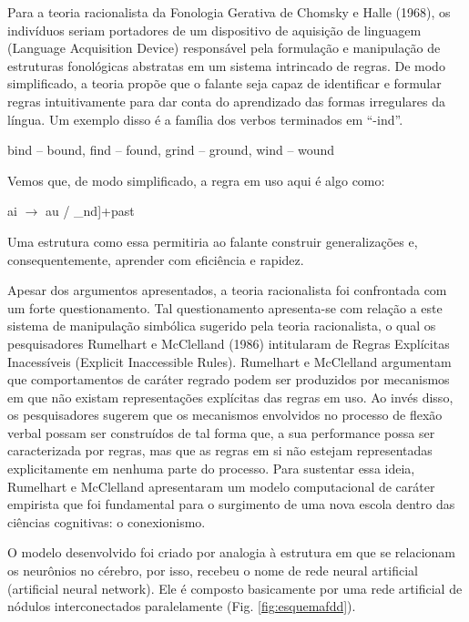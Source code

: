 Para a teoria racionalista da Fonologia Gerativa de Chomsky e Halle (1968), os indivíduos seriam portadores de um dispositivo de aquisição de linguagem (Language Acquisition Device) responsável pela formulação e manipulação de estruturas fonológicas abstratas em um sistema intrincado de regras. De modo simplificado, a teoria propõe que o falante seja capaz de identificar e formular regras intuitivamente para dar conta do aprendizado das formas irregulares da língua. Um exemplo disso é a família dos verbos terminados em “-ind”.

\begin{center}
bind – bound, find – found, grind – ground, wind – wound
\end{center}

Vemos que, de modo simplificado, a regra em uso aqui é algo como:
\begin{center}
ai $\rightarrow$ au / \_nd]+past
\end{center}

Uma estrutura como essa permitiria ao falante construir generalizações e, consequentemente, aprender com eficiência e rapidez. 

Apesar dos argumentos apresentados, a teoria racionalista foi confrontada com um forte questionamento. Tal questionamento apresenta-se com relação a este sistema de manipulação simbólica sugerido pela teoria racionalista, o qual os pesquisadores Rumelhart e McClelland (1986) intitularam de Regras Explícitas Inacessíveis (Explicit Inaccessible Rules). Rumelhart e McClelland argumentam que comportamentos de caráter regrado podem ser produzidos por mecanismos em que não existam representações explícitas das regras em uso. Ao invés disso, os pesquisadores sugerem que os mecanismos envolvidos no processo de flexão verbal possam ser construídos de tal forma que, a sua performance possa ser caracterizada por regras, mas que as regras em si não estejam representadas explicitamente em nenhuma parte do processo. Para sustentar essa ideia, Rumelhart e McClelland apresentaram um modelo computacional  de caráter empirista que foi fundamental para o surgimento de uma nova escola dentro das ciências cognitivas: o conexionismo.





O modelo desenvolvido foi criado por analogia à estrutura em que se relacionam os neurônios no cérebro, por isso, recebeu o nome de rede neural artificial (artificial neural network). Ele é composto basicamente por uma rede artificial de nódulos interconectados paralelamente (Fig. \ref{fig:esquemafdd}).




